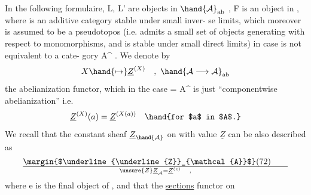 In the following formulaire, L, L' are objects in $\hand{\mathcal{A}}_{\mathrm{ab}}$ , F is an
object in , where  is an additive category stable under small inver-%
\margin{$\times$}se limits, which moreover is assumed to be a pseudotopos (i.e. admits
a small set of objects generating with respect to monomorphisms, and is
stable under small direct limits) in case   is not equivalent to a cate-%
gory A\^{} . We denote by 
\[
X\hand{\mapsto}\underline{Z}^{(X)} \quad , \ \hand{\mathcal{A}\longrightarrow\mathcal{A}}_{\mathrm{ab}}
\]
the abelianization functor, which in  the case   = A\^{} is just
``componentwise abelianization'' i.e.
\[
\underline{Z}^{(X)}(a) = \underline{Z}^{(X(a))} \quad \hand{for $a$ in $A$.}
\]
We recall that the constant sheaf $\underline{Z}_{\hand{\mathcal{A}}}$ on  with value $\underline{Z}$ can be also
described as
\[
\margin{$\underline{\underline{Z}}_{\mathcal{A}}$}(72)\qquad \over{\unsure{Z}}{\underline{Z}_{\mathcal{A}}} = \underline{Z}^{(e)} \quad ,
\]
where e is the final object of  , and that the \uline{sections} functor on 

